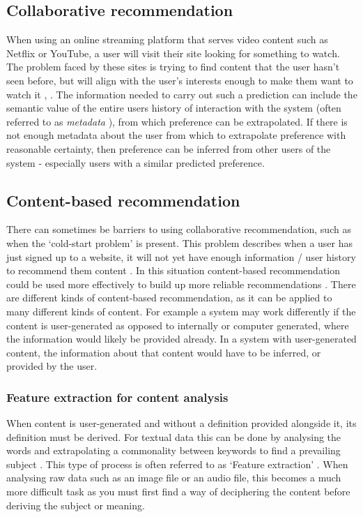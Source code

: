 \documentclass[a4paper,12pt]{article}
\begin{document}
  \subsection{Collaborative recommendation}
    When using an online streaming platform that serves video content such as Netflix or YouTube, a user will visit their site looking for something to watch. The problem faced by these sites is trying to find content that the user hasn't seen before, but will align with the user's interests enough to make them want to watch it \citep{davidson2010youtube}, \citep{gomez2016netflix}.
    The information needed to carry out such a prediction can include the semantic value of the entire users history of interaction with the system (often referred to as \textit{metadata} \citep{duval2002metadata}), from which preference can be extrapolated. If there is not enough metadata about the user from which to extrapolate preference with reasonable certainty, then preference can be inferred from other users of the system - especially users with a similar predicted preference.

  \subsection{Content-based recommendation}
    There can sometimes be barriers to using collaborative recommendation, such as when the ‘cold-start problem’ is present. This problem describes when a user has just signed up to a website, it will not yet have enough information / user history to recommend them content \citep{schein2002methods}.
    In this situation content-based recommendation could be used more effectively to build up more reliable recommendations \citep{lops2011content}.
    There are different kinds of content-based recommendation, as it can be applied to many different kinds of content. For example a system may work differently if the content is user-generated as opposed to internally or computer generated, where the information would likely be provided already. In a system with user-generated content, the information about that content would have to be inferred, or provided by the user.

    \subsubsection{Feature extraction for content analysis}
      When content is user-generated and without a definition provided alongside it, its definition must be derived. For textual data this can be done by analysing the words and extrapolating a commonality between keywords to find a prevailing subject \citep{sanderson1999deriving}.
      This type of process is often referred to as ‘Feature extraction’ \citep{guyon2006introduction}.
      When analysing raw data such as an image file or an audio file, this becomes a much more difficult task as you must first find a way of deciphering the content before deriving the subject or meaning.
\end{document}
